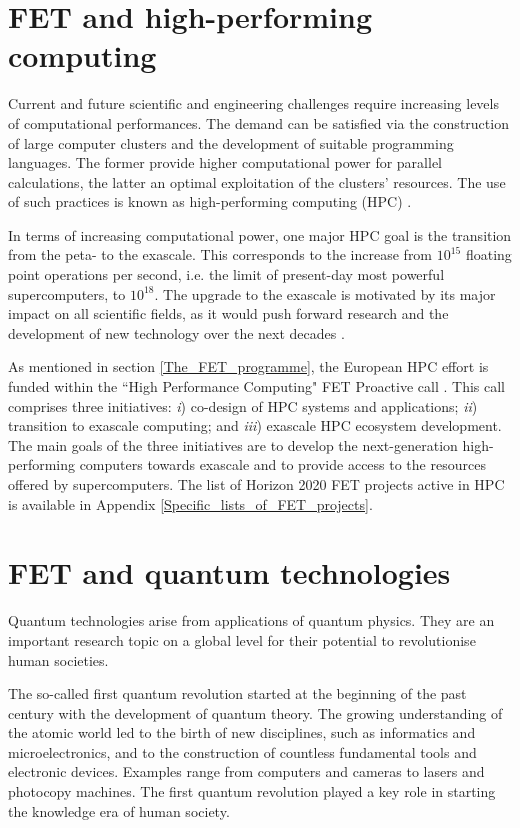 \section{FET and high-performing computing} \label{FET_and_high-performing_computing}
Current and future scientific and engineering challenges require increasing levels of computational performances. The demand can be satisfied via the construction of large computer clusters and the development of suitable programming languages. The former provide higher computational power for parallel calculations, the latter an optimal exploitation of the clusters' resources. The use of such practices is known as high-performing computing (HPC) \cite{Hager}.

In terms of increasing computational power, one major HPC goal is the transition from the peta- to the exascale. This corresponds to the increase from $10^{15}$ floating point operations per second, i.e. the limit of present-day most powerful supercomputers, to $10^{18}$. The upgrade to the exascale is motivated by its major impact on all scientific fields, as it would push forward research and the development of new technology over the next decades \cite{Vetter}. 

As mentioned in section \ref{The_FET_programme}, the European HPC effort is funded within the ``High Performance Computing" FET Proactive call \cite{HPC}. This call comprises three initiatives: \textit{i}) co-design of HPC systems and applications; \textit{ii}) transition to exascale computing; and \textit{iii}) exascale HPC ecosystem development. The main goals of the three initiatives are to develop the next-generation high-performing computers towards exascale and to provide access to the resources offered by supercomputers. The list of Horizon 2020 FET projects active in HPC is available in Appendix \ref{Specific_lists_of_FET_projects}.

\section{FET and quantum technologies} \label{FET_and_quantum_technologies}
Quantum technologies arise from applications of quantum physics. They are an important research topic on a global level for their potential to revolutionise human societies.

The so-called first quantum revolution started at the beginning of the past century with the development of quantum theory. The growing understanding of the atomic world led to the birth of new disciplines, such as informatics and microelectronics, and to the construction of countless fundamental tools and electronic devices. Examples range from computers and cameras to lasers and photocopy machines. The first quantum revolution played a key role in starting the knowledge era of human society.

